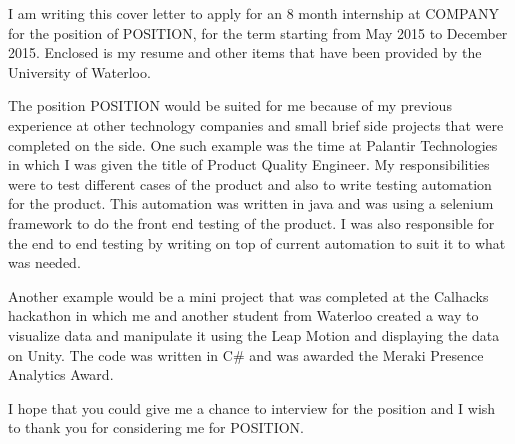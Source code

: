 \documentclass[10pt,stdletter,dateno,sigleft]{newlfm} %
\begin{document}
\begin{newlfm}


I am writing this cover letter to apply for an 8 month internship at COMPANY for the position of 
POSITION, for the term starting from May 2015 to December 2015.  Enclosed is my resume and other 
items that have been provided by the University of Waterloo.

The position POSITION would be suited for me because of my previous experience at other technology companies and small brief side projects that were completed on the side. One such example was the time at Palantir Technologies in which I was given the title of Product Quality Engineer.  My responsibilities were to test different cases of the product and also to write testing automation for the product.  This automation was written in java and was using a selenium framework to do the front end testing of the product.  I was also responsible for the end to end testing by writing on top of current automation to suit it to what was needed.

Another example would be a mini project that was completed at the Calhacks hackathon in which me and another student from Waterloo created a way to visualize data and manipulate it using the Leap Motion and displaying the data on Unity.  The code was written in C\# and was awarded the Meraki Presence Analytics Award.

I hope that you could give me a chance to interview for the position and I wish to thank you for considering me for POSITION.


\end{newlfm}
\end{document}
